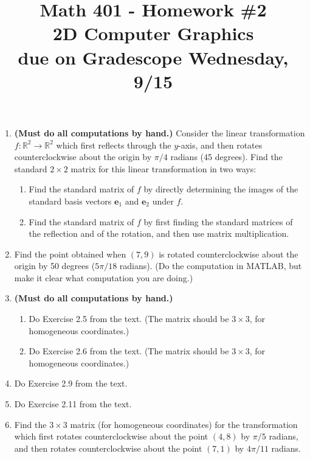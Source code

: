 \documentclass{article}
\newcommand{\R}{\mathbb{R}}
\begin{document}
\title{Math 401 - Homework \#2\\ 2D Computer Graphics\\ due on Gradescope Wednesday, 9/15}
\author{}
\date{}
\maketitle


\begin{enumerate}
	\item \textbf{(Must do all computations by hand.)} Consider the linear transformation $f: \R^2 \to \R^2$ which first reflects through the $y$-axis, and then rotates counterclockwise about the origin by $\pi/4$ radians (45 degrees).  Find the standard $2 \times 2$ matrix for this linear transformation in two ways:
	\begin{enumerate}
		\item Find the standard matrix of $f$ by directly determining the images of the standard basis vectors $\mathbf{e}_1$ and $\mathbf{e}_2$ under $f$.
		\item Find the standard matrix of $f$ by first finding the standard matrices of the reflection and of the rotation, and then use matrix multiplication.
	\end{enumerate}
	



	\item Find the point obtained when $(7, 9)$ is rotated counterclockwise about the origin by 50 degrees ($5\pi/18$ radians).  (Do the computation in MATLAB, but make it clear what computation you are doing.)
	
	\item \textbf{(Must do all computations by hand.)} \begin{enumerate}
		\item Do Exercise 2.5 from the text.  (The matrix should be $3 \times 3$, for homogeneous coordinates.)
		\item Do Exercise 2.6 from the text.  (The matrix should be $3 \times 3$, for homogeneous coordinates.)
	\end{enumerate}
	
	\item Do Exercise 2.9 from the text.
	
	\item Do Exercise 2.11 from the text.
	
	\item Find the $3 \times 3$ matrix (for homogeneous coordinates) for the transformation which first rotates counterclockwise about the point $(4, 8)$ by $\pi/5$ radians, and then rotates counterclockwise about the point $(7,1)$ by $4\pi/11$ radians.
	

\end{enumerate}
\end{document}
